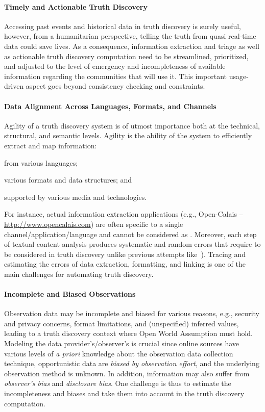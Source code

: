 \documentclass[prodmode,acmtecs]{acmsmall} %
\begin{document}
\paragraph*{Timely and Actionable Truth Discovery} 
Accessing past events and historical data in truth discovery is surely useful, however,
from a humanitarian perspective, telling the truth from quasi real-time data 
could save lives. As a consequence, information extraction and triage as well as actionable
truth discovery computation need to be streamlined, prioritized,  and adjusted to the level 
of emergency and incompleteness of available information regarding the communities that will 
use it. This important usage-driven aspect goes beyond consistency checking and constraints.
%

\paragraph*{Data Alignment Across Languages, Formats, and Channels} 
Agility of a truth discovery system is of utmost importance both at 
the technical, structural, and semantic levels. 
Agility is the ability of the system 
to efficiently extract and map information: 
\begin{inparaenum}[(i)]
\item from various languages;
\item various formats and data structures; and
\item supported by various media and technologies.
\end{inparaenum}
For instance, actual information extraction applications (e.g., Open-Calais -- \url{http://www.opencalais.com})  
are often specific to a single channel/application/language and cannot be considered as . Moreover,
each step of textual content analysis produces systematic and random errors that 
require to be considered in truth discovery unlike previous attempts like~\cite{GoasdoueKKLMZ13}). 
Tracing and estimating  the errors of data extraction, formatting, and linking
is one of the main challenges for automating truth discovery. 
%

\paragraph*{Incomplete and Biased Observations}  
Observation data may be incomplete and biased for various 
reasons, e.g., security and privacy concerns, format limitations, and 
(unspecified) inferred values, leading to a truth discovery context where Open World
Assumption must hold. Modeling the data provider's/observer's is crucial since online 
sources have  various levels of {\it a priori} knowledge about the observation data 
collection technique, opportunistic data are {\it biased by  observation effort}, and the underlying
observation method is unknown. In addition, information may also suffer from \emph{observer's bias} and
\emph{disclosure bias}. One challenge is thus to estimate the incompleteness and biases and take them into
account in the truth discovery computation.
\end{document}
